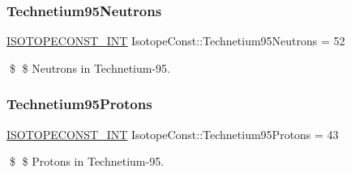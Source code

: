 \subsubsection{\texorpdfstring{Technetium95\+Neutrons}{Technetium95Neutrons}}
{\footnotesize\ttfamily \mbox{\hyperlink{group___isotope_const-_macros_ga5f18360b3e99483a35c32d789e62621c}{I\+S\+O\+T\+O\+P\+E\+C\+O\+N\+S\+T\+\_\+\+I\+NT}} Isotope\+Const\+::\+Technetium95\+Neutrons = 52}

\$ \$ Neutrons in Technetium-\/95. \mbox{\label{group___isotope_const-_technetium-_tc95_ga9aec2473adb40de1a687b79d3cc26898}} 
\subsubsection{\texorpdfstring{Technetium95\+Protons}{Technetium95Protons}}
{\footnotesize\ttfamily \mbox{\hyperlink{group___isotope_const-_macros_ga5f18360b3e99483a35c32d789e62621c}{I\+S\+O\+T\+O\+P\+E\+C\+O\+N\+S\+T\+\_\+\+I\+NT}} Isotope\+Const\+::\+Technetium95\+Protons = 43}

\$ \$ Protons in Technetium-\/95. 